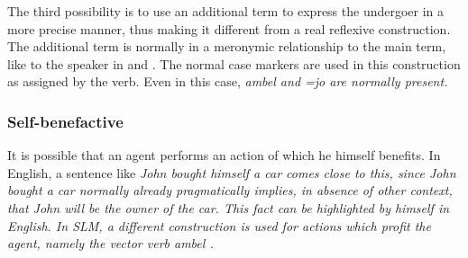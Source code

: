 


The third possibility is to use an additional term to express the undergoer in a more precise manner, thus making it different from a real reflexive construction. The additional term is normally in a meronymic relationship to the main term, like  to the speaker in  and . The normal case markers are used in this construction as assigned by the verb.
Even in this case, \em ambel \em and \em =jo \em are normally present.










\subsubsection{Self-benefactive}\label{sec:func:Self-benefactive}
It is possible that an agent performs an action of which he himself benefits. In English, a sentence like \em John bought himself a car \em comes close to this, since \em John bought a car \em normally already pragmatically implies, in absence of other context, that John will be the owner of the car. This fact can be highlighted by \em himself \em in English. In SLM, a different construction is used for actions which profit the agent, namely the vector verb \em ambel \em {}.


